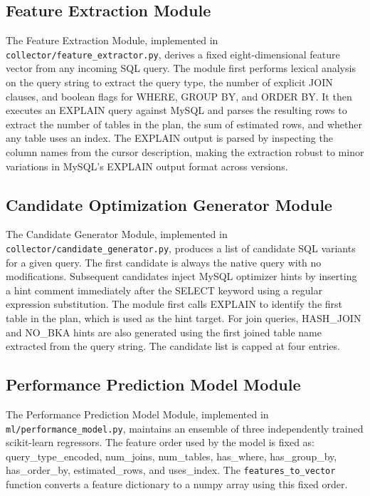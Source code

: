 \subsection{Feature Extraction Module}
\label{subsec:feature_extraction}

The Feature Extraction Module, implemented in
\texttt{collector/feature\_extractor.py}, derives a fixed eight-dimensional
feature vector from any incoming SQL query. The module first performs lexical
analysis on the query string to extract the query type, the number of explicit
JOIN clauses, and boolean flags for WHERE, GROUP BY, and ORDER BY. It then
executes an EXPLAIN query against MySQL and parses the resulting rows to
extract the number of tables in the plan, the sum of estimated rows, and
whether any table uses an index. The EXPLAIN output is parsed by inspecting
the column names from the cursor description, making the extraction robust to
minor variations in MySQL's EXPLAIN output format across versions.

\subsection{Candidate Optimization Generator Module}
\label{subsec:candidate_generator}

The Candidate Generator Module, implemented in
\texttt{collector/candidate\_generator.py}, produces a list of candidate
SQL variants for a given query. The first candidate is always the native
query with no modifications. Subsequent candidates inject MySQL optimizer
hints by inserting a hint comment immediately after the SELECT keyword using
a regular expression substitution. The module first calls EXPLAIN to
identify the first table in the plan, which is used as the hint target. For
join queries, HASH\_JOIN and NO\_BKA hints are also generated using the first
joined table name extracted from the query string. The candidate list is
capped at four entries.

\subsection{Performance Prediction Model Module}
\label{subsec:prediction_model}

The Performance Prediction Model Module, implemented in
\texttt{ml/performance\_model.py}, maintains an ensemble of three
independently trained scikit-learn regressors. The feature order used by the
model is fixed as: query\_type\_encoded, num\_joins, num\_tables, has\_where,
has\_group\_by, has\_order\_by, estimated\_rows, and uses\_index. The
\texttt{features\_to\_vector} function converts a feature dictionary to a
numpy array using this fixed order.

